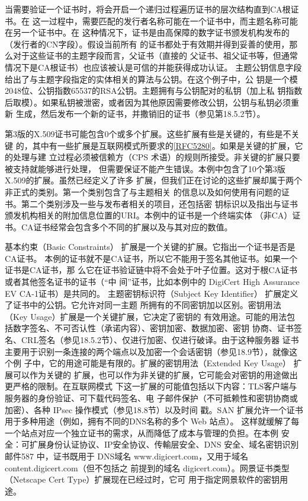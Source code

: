 当需要验证一个证书时，将会开启一个递归过程遍历证书的层次结构直到CA根证书。在
这一过程中，需要匹配的发行者名称可能在一个证书中，而主题名称可能在另一个证书中。在
这种情况下，证书是由高保障的数字证书颁发机构发布的（发行者的CN字段）。假设当前所有
的证书都处于有效期并得到妥善的使用，那么对于这些证书的主题字段而言，父证书（直接的
父证书、祖父证书等，但通常情况下是CA根证书）也应该被认是可信的并能获得成功认证。
主题公钥信息字段给出了与主题字段指定的实体相关的算法与公钥。在这个例子中，公
钥是一个模2048位、公钥指数65537的RSA公钥。主题拥有与公钥配对的私钥（加上私
钥指数后取模）。如果私钥被泄密，或者因为其他原因需要修改公钥，公钥与私钥必须重新
生成，然后发布一个新的证书，并撒销旧的证书（参见第18.5.2节）。

第3版的X.509证书可能包含0个或多个扩展。这些扩展有些是关键的，有些是不关键
的，其中有一些扩展是互联网模式所要求的\href{https://www.rfc-editor.org/rfc/rfc5280}{[RFC5280]}。如果是关键的扩展，它的处理与建
立过程必须被信赖方（CPS 术语）的规则所接受。非关键的扩展只要被支持就能够进行处理，
但需要保证不能产生错误。本例中包含了10个第3版X.509的扩展。虽然已经定义了许多
扩展，但我们正在讨论的这些扩展却属于两个非正式的类别。第一个类别包含了与主题相关
的信息以及如何使用有问题的证书。第二个类别涉及一些与发布者相关的项目，还包括密
钥标识以及指出与证书颁发机构相关的附加信息位置的URI。本例中的证书是一个终端实体
（非CA）证书。CA证书经常会包含多个不同的扩展以及与其对应的数值。

基本约束（Basic Constraints） 扩展是一个关键的扩展。它指出一个证书是否是CA证书。
本例的证书就不是CA证书，所以它不能用于签名其他证书。如果一个证书是CA证书，那
么它在证书验证链中将不会处于叶子位置。这对于根CA证书或者其他签名证书的证书（“中
间”证书，比如本例中的 DigiCert High Assurance EV CA-1证书）是共同的。
主题密钥标识符（Subject Key Identifier） 扩展定义了证书中的公钥。它允许对同一主题
所拥有的不同密钥加以区别。密钥用法（Key Usage）扩展是一个关键扩展，它决定了密钥的
有效用途。可能的用法包括数字签名、不可否认性（承诺内容）、密钥加密、数据加密、密钥
协商、证书签名、CRL签名（参见18.5.2节）、仅进行加密、仅进行破译。由于这种服务器
证书主要用于识别一条连接的两个端点以及加密一个会话密钥（参见18.9节），就像这个例
子中，它的用途可能是有限的。扩展的密钥用法（Extended Key Usage） 扩展可以作为关键的
扩展，也可以作为非关键的扩展，它可能会对密钥的用途做出更严格的限制。在互联网模式
下这一扩展的可能值包括以下内容：TLS客户端与服务器的身份验证、可下载代码签名、电
子邮件保护（不可抵赖性和密钥协商或加密）、各种 IPsec 操作模式（参见18.8节）以及时间
戳。SAN 扩展允许一个证书用于多种用途（例如，拥有不同的DNS名称的多个 Web 站点）。
这样就缓解了每一个站点对应一个独立证书的需求，从而降低了成本与管理的负担。在本例
安全：可扩展身份认证协议、IP安全协议、传輸层安全、DNS 安全、域名密钥识別邮件587
中，证书既用于 DNS域名 www.digicert.com，又用于域名 content.digicert.com（但不包括之
前提到的域名 digicert.com）。网景证书类型（Netscape Cert Type）扩展现在已经过时，它可
用于指定网景软件的密钥用途。

